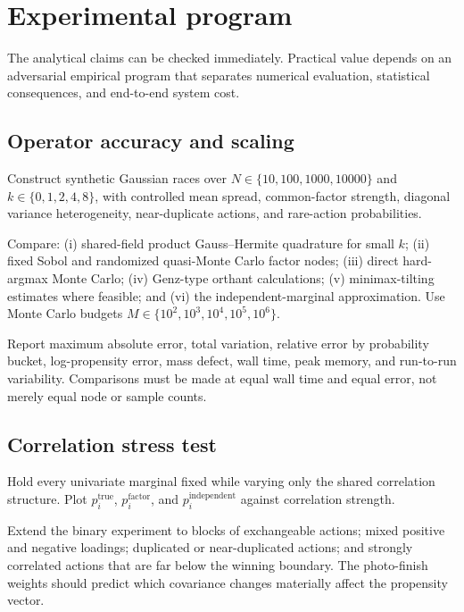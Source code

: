 \documentclass[11pt]{article}
\begin{document}
\section{Experimental program}
\label{sec:experiments}

The analytical claims can be checked immediately. Practical value depends on an adversarial empirical program that separates numerical evaluation, statistical consequences, and end-to-end system cost.

\subsection{Operator accuracy and scaling}

Construct synthetic Gaussian races over $N \in \{10, 100, 1000, 10000\}$ and $k \in \{0, 1, 2, 4, 8\}$, with controlled mean spread, common-factor strength, diagonal variance heterogeneity, near-duplicate actions, and rare-action probabilities.

Compare: (i) shared-field product Gauss--Hermite quadrature for small $k$; (ii) fixed Sobol and randomized quasi-Monte Carlo factor nodes; (iii) direct hard-argmax Monte Carlo; (iv) Genz-type orthant calculations; (v) minimax-tilting estimates where feasible; and (vi) the independent-marginal approximation. Use Monte Carlo budgets $M \in \{10^2, 10^3, 10^4, 10^5, 10^6\}$.

Report maximum absolute error, total variation, relative error by probability bucket, log-propensity error, mass defect, wall time, peak memory, and run-to-run variability. Comparisons must be made at equal wall time and equal error, not merely equal node or sample counts.

\subsection{Correlation stress test}

Hold every univariate marginal fixed while varying only the shared correlation structure. Plot $p_i^{\mathrm{true}}$, $p_i^{\mathrm{factor}}$, and $p_i^{\mathrm{independent}}$ against correlation strength.

Extend the binary experiment to blocks of exchangeable actions; mixed positive and negative loadings; duplicated or near-duplicated actions; and strongly correlated actions that are far below the winning boundary. The photo-finish weights should predict which covariance changes materially affect the propensity vector.
\end{document}
